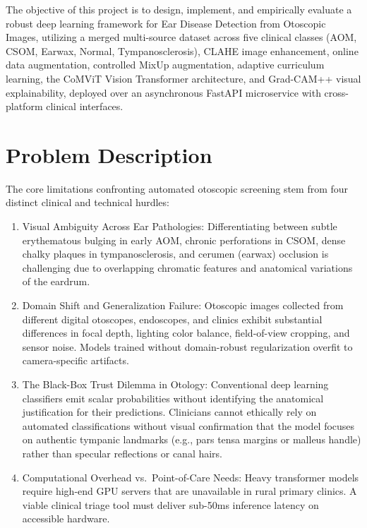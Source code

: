\documentclass[12pt,a4paper]{report}
\renewcommand{\textbf}[1]{#1}
\begin{document}
The objective of this project is to design, implement, and empirically evaluate a robust deep learning framework for \textbf{Ear Disease Detection from Otoscopic Images}, utilizing a merged multi-source dataset across five clinical classes (\textbf{AOM}, \textbf{CSOM}, \textbf{Earwax}, \textbf{Normal}, \textbf{Tympanosclerosis}), \textbf{CLAHE} image enhancement, \textbf{online data augmentation}, \textbf{controlled MixUp augmentation}, \textbf{adaptive curriculum learning}, the \textbf{CoMViT} Vision Transformer architecture, and \textbf{Grad-CAM++} visual explainability, deployed over an asynchronous \textbf{FastAPI} microservice with cross-platform clinical interfaces.

\section{Problem Description}
The core limitations confronting automated otoscopic screening stem from four distinct clinical and technical hurdles:
\begin{enumerate}
    \item \textbf{Visual Ambiguity Across Ear Pathologies:} Differentiating between subtle erythematous bulging in early AOM, chronic perforations in CSOM, dense chalky plaques in tympanosclerosis, and cerumen (earwax) occlusion is challenging due to overlapping chromatic features and anatomical variations of the eardrum.
    \item \textbf{Domain Shift and Generalization Failure:} Otoscopic images collected from different digital otoscopes, endoscopes, and clinics exhibit substantial differences in focal depth, lighting color balance, field-of-view cropping, and sensor noise. Models trained without domain-robust regularization overfit to camera-specific artifacts.
    \item \textbf{The Black-Box Trust Dilemma in Otology:} Conventional deep learning classifiers emit scalar probabilities without identifying the anatomical justification for their predictions. Clinicians cannot ethically rely on automated classifications without visual confirmation that the model focuses on authentic tympanic landmarks (e.g., pars tensa margins or malleus handle) rather than specular reflections or canal hairs.
    \item \textbf{Computational Overhead vs.\ Point-of-Care Needs:} Heavy transformer models require high-end GPU servers that are unavailable in rural primary clinics. A viable clinical triage tool must deliver sub-50ms inference latency on accessible hardware.
\end{enumerate}
\end{document}
